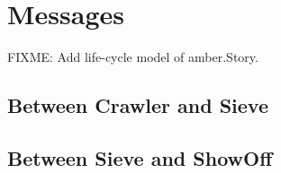 \section{\label{sct:messages}Messages}

FIXME: Add life-cycle model of amber.Story.


\subsection{Between Crawler and Sieve}


\subsection{Between Sieve and ShowOff}


